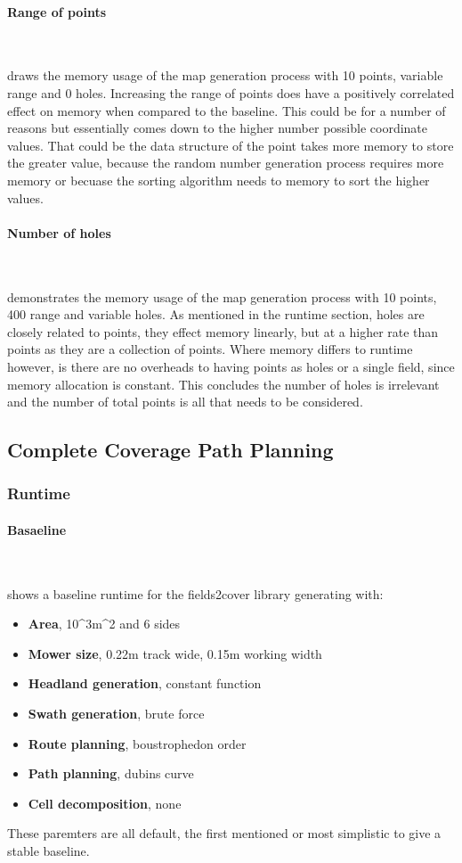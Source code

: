 \documentclass[final]{cmpreport_02}
\begin{document}
\paragraph{Range of points} \

 draws the memory usage of the map generation process with 10 points, variable range and 0 holes.
Increasing the range of points does have a positively correlated effect on memory when compared to the baseline.
This could be for a number of reasons but essentially comes down to the higher number possible coordinate values.
That could be the data structure of the point takes more memory to store the greater value, because the random number generation process requires more memory or becuase the sorting algorithm needs to memory to sort the higher values.

\paragraph{Number of holes} \

 demonstrates the memory usage of the map generation process with 10 points, 400 range and variable holes.
As mentioned in the runtime section, holes are closely related to points, they effect memory linearly, but at a higher rate than points as they are a collection of points.
Where memory differs to runtime however, is there are no overheads to having points as holes or a single field, since memory allocation is constant.
This concludes the number of holes is irrelevant and the number of total points is all that needs to be considered.


\subsection{Complete Coverage Path Planning}
\subsubsection{Runtime}
\paragraph{Basaeline} \

 shows a baseline runtime for the fields2cover library generating with:

\begin{itemize}
	\item{\textbf{Area}, 10^3m^2 and 6 sides}
	\item{\textbf{Mower size}, 0.22m track wide, 0.15m working width}
	\item{\textbf{Headland generation}, constant function}
	\item{\textbf{Swath generation}, brute force}
	\item{\textbf{Route planning}, boustrophedon order}
	\item{\textbf{Path planning}, dubins curve}
	\item{\textbf{Cell decomposition}, none}
\end{itemize}
These paremters are all default, the first mentioned or most simplistic to give a stable baseline.
\end{document}
